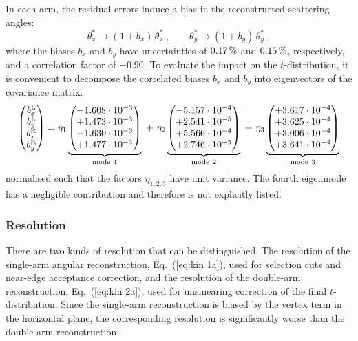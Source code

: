 In each arm, the residual errors induce a bias in the reconstructed scattering angles:
\begin{equation}
\label{eq:opt bias}
	\theta_x^* \rightarrow (1 + b_x)\, \theta_x^*\ ,\qquad
	\theta_y^* \rightarrow (1 + b_y)\, \theta_y^*\ ,
\end{equation}
where the biases $b_x$ and $b_y$ have uncertainties of $0.17\,{\rm \%}$ and $0.15\,{\rm \%}$, respectively, and a correlation factor of $-0.90$. To evaluate the impact on the $t$-distribution, it is convenient to decompose the correlated biases $b_x$ and $b_y$ into eigenvectors of the covariance matrix:
\begin{equation}
\label{eq:opt bias modes}
\begin{pmatrix} b_x^{\rm L}\cr b_y^{\rm L} \cr b_x^{\rm R}\cr b_y^{\rm R} \end{pmatrix} =
	   \eta_1 \underbrace{\begin{pmatrix} -1.608\cdot10^{-3}\cr +1.473\cdot10^{-3}\cr -1.630\cdot10^{-3}\cr +1.477\cdot10^{-3} \end{pmatrix}}_{\rm mode\ 1}
  \ +\ \eta_2 \underbrace{\begin{pmatrix} -5.157\cdot10^{-4}\cr +2.541\cdot10^{-5}\cr +5.566\cdot10^{-4}\cr +2.746\cdot10^{-5} \end{pmatrix}}_{\rm mode\ 2}
  \ +\ \eta_3 \underbrace{\begin{pmatrix} +3.617\cdot10^{-4}\cr +3.625\cdot10^{-4}\cr +3.006\cdot10^{-4}\cr +3.641\cdot10^{-4} \end{pmatrix}}_{\rm mode\ 3}
\end{equation}
normalised such that the factors $\eta_{1,2,3}$ have unit variance. The fourth eigenmode has a negligible contribution and therefore is not explicitly listed.




\subsubsection{Resolution}
\label{sec:resolution}

There are two kinds of resolution that can be distinguished. The resolution of the single-arm angular reconstruction, Eq.~(\ref{eq:kin 1a}), used for selection cuts and near-edge acceptance correction, and the resolution of the double-arm reconstruction, Eq.~(\ref{eq:kin 2a}), used for unsmearing correction of the final $t$-distribution. Since the single-arm reconstruction is biased by the vertex term in the horizontal plane, the corresponding resolution is significantly worse than the double-arm reconstruction.

